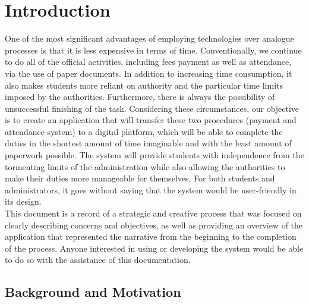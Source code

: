 
\section{Introduction}\label{sec:introduction}
One of the most significant advantages of employing technologies over analogue processes is that it is less expensive in terms of time. Conventionally, we continue to do all of the official activities, including fees payment as well as attendance, via the use of paper documents. In addition to increasing time consumption, it also makes students more reliant on authority and the particular time limits imposed by the authorities. Furthermore, there is always the possibility of unsuccessful finishing of the task. Considering these circumstances, our objective is to create an application that will transfer these two procedures (payment and attendance system) to a digital platform, which will be able to complete the duties in the shortest amount of time imaginable and with the least amount of paperwork possible. The system will provide students with independence from the tormenting limits of the administration while also allowing the authorities to make their duties more manageable for themselves. For both students and administrators, it goes without saying that the system would be user-friendly in its design.\\

This document is a record of a strategic and creative process that was focused on clearly describing concerns and objectives, as well as providing an overview of the application that represented the narrative from the beginning to the completion of the process. Anyone interested in using or developing the system would be able to do so with the assistance of this documentation.


\clearpage


\subsection{Background and Motivation}\label{subsec:bm}

